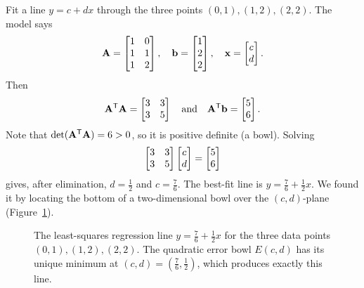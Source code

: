\begin{example}
\label{ch36:ex-lsq}
Fit a line $y = c + dx$ through the three points $(0,1),(1,2),(2,2)$. The model says
\[
  \mathbf{A}=\begin{bmatrix}1&0\\1&1\\1&2\end{bmatrix},\quad
  \mathbf{b}=\begin{bmatrix}1\\2\\2\end{bmatrix},\quad
  \mathbf{x}=\begin{bmatrix}c\\d\end{bmatrix}.
\]
Then
\[
  \mathbf{A}^{\mathsf{T}}\mathbf{A}=\begin{bmatrix}3&3\\3&5\end{bmatrix} \quad \text{and} \quad \mathbf{A}^{\mathsf{T}}\mathbf{b}=\begin{bmatrix}5\\6\end{bmatrix}.
\]
Note that $\det(\mathbf{A}^{\mathsf{T}}\mathbf{A})=6>0$, so it is positive definite (a bowl). Solving
\[
  \begin{bmatrix}3&3\\3&5\end{bmatrix}\begin{bmatrix}c\\d\end{bmatrix}=\begin{bmatrix}5\\6\end{bmatrix}
\]
gives, after elimination, $d=\tfrac12$ and $c=\tfrac76$. The best-fit line is $y=\tfrac76+\tfrac12
x$. We found it by locating the bottom of a two-dimensional bowl over the
$(c,d)$-plane (Figure~\ref{ch36:fig-lsq}).
\end{example}

\begin{figure}[H]
\centering
{}
\caption{The least-squares regression line $y = \frac{7}{6} + \frac{1}{2}x$ for the three data points $(0,1), (1,2), (2,2)$. The quadratic error bowl $E(c,d)$ has its unique minimum at $(c,d) = (\frac{7}{6}, \frac{1}{2})$, which produces exactly this line.}
\label{ch36:fig-lsq}
\end{figure}

